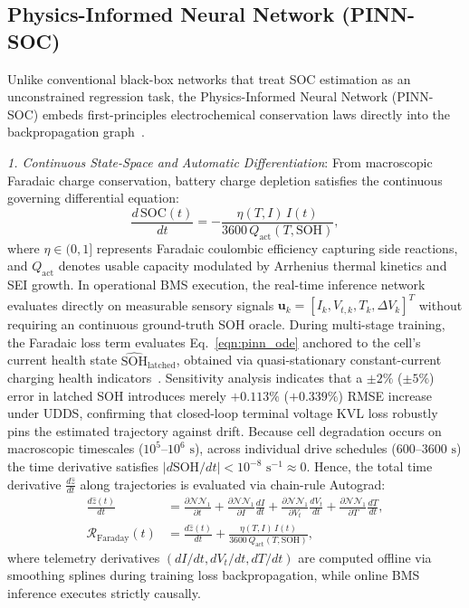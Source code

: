 \documentclass[preprint,12pt]{elsarticle}
\begin{document}
\subsection{Physics-Informed Neural Network (PINN-SOC)}
Unlike conventional black-box networks that treat SOC estimation as an unconstrained regression task, the Physics-Informed Neural Network (PINN-SOC) embeds first-principles electrochemical conservation laws directly into the backpropagation graph~\cite{Raissi2019pinn,Brancato2026,Li2023nature}.

\emph{1. Continuous State-Space and Automatic Differentiation}: From macroscopic Faradaic charge conservation, battery charge depletion satisfies the continuous governing differential equation:
\begin{equation}\label{eqn:pinn_ode}
\frac{d\,\text{SOC}(t)}{dt} = -\frac{\eta(T, I)\, I(t)}{3600\,Q_{\text{act}}(T, \text{SOH})},
\end{equation}
where $\eta \in (0, 1]$ represents Faradaic coulombic efficiency capturing side reactions, and $Q_{\text{act}}$ denotes usable capacity modulated by Arrhenius thermal kinetics and SEI growth. In operational BMS execution, the real-time inference network evaluates directly on measurable sensory signals $\mathbf{u}_k = [I_k, V_{t,k}, T_k, \Delta V_k]^T$ without requiring an continuous ground-truth SOH oracle. During multi-stage training, the Faradaic loss term evaluates Eq.~\eqref{eqn:pinn_ode} anchored to the cell's current health state $\hat{\text{SOH}}_{\text{latched}}$, obtained via quasi-stationary constant-current charging health indicators~\cite{Le2026charging}. Sensitivity analysis indicates that a $\pm 2\%$ ($\pm 5\%$) error in latched SOH introduces merely $+0.113\%$ ($+0.339\%$) RMSE increase under UDDS, confirming that closed-loop terminal voltage KVL loss robustly pins the estimated trajectory against drift. Because cell degradation occurs on macroscopic timescales ($10^5\text{--}10^6\text{ s}$), across individual drive schedules ($600\text{--}3600\text{ s}$) the time derivative satisfies $|d\text{SOH}/dt| < 10^{-8}\text{ s}^{-1} \approx 0$. Hence, the total time derivative $\frac{d\hat{z}}{dt}$ along trajectories is evaluated via chain-rule Autograd:
\begin{align}
\frac{d\hat{z}(t)}{dt} &= \frac{\partial \mathcal{NN}_1}{\partial t} + \frac{\partial \mathcal{NN}_1}{\partial I} \frac{dI}{dt} + \frac{\partial \mathcal{NN}_1}{\partial V_t} \frac{dV_t}{dt} + \frac{\partial \mathcal{NN}_1}{\partial T} \frac{dT}{dt}, \label{eqn:pinn_chain}\\
\mathcal{R}_{\text{Faraday}}(t) &= \frac{d\hat{z}(t)}{dt} + \frac{\eta(T, I)\, I(t)}{3600\,Q_{\text{act}}(T, \text{SOH})}, \label{eqn:res_faraday}
\end{align}
where telemetry derivatives $(dI/dt, dV_t/dt, dT/dt)$ are computed offline via smoothing splines during training loss backpropagation, while online BMS inference executes strictly causally.
\end{document}
